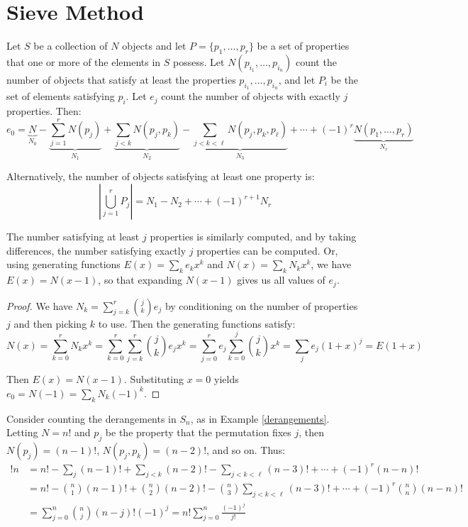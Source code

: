 \documentclass[a4paper]{article}
\begin{document}
\section{Sieve Method}
\begin{theorem}
Let $S$ be a collection of $N$ objects and let $P=\{p_1,\dots,p_r\}$ be a set of properties that one or more of the elements in $S$ possess. Let $N(p_{i_1},\dots,p_{i_n})$ count the number of objects that satisfy at least the properties $p_{i_1},\dots,p_{i_n}$, and let $P_i$ be the set of elements satisfying $p_i$. Let $e_j$ count the number of objects with exactly $j$ properties. Then:
\begin{equation*}
e_0
=\underbrace{N}_{N_0}-\underbrace{\sum_{j=1}^rN(p_j)}_{N_1}+\underbrace{\sum_{j<k}N(p_j,p_k)}_{N_2}-\underbrace{\sum_{j<k<\ell}N(p_j,p_k,p_\ell)}_{N_3}+\cdots+(-1)^r\underbrace{N(p_1,\dots,p_r)}_{N_r}
\end{equation*}

Alternatively, the number of objects satisfying at least one property is:
\begin{equation*}
\left|\bigcup_{j=1}^rP_j\right|
=N_1-N_2+\cdots+(-1)^{r+1}N_r
\end{equation*}

The number satisfying at least $j$ properties is similarly computed, and by taking differences, the number satisfying exactly $j$ properties can be computed. Or, using generating functions $E(x)=\sum_ke_kx^k$ and $N(x)=\sum_kN_kx^k$, we have $E(x)=N(x-1)$, so that expanding $N(x-1)$ gives us all values of $e_j$.
\begin{hl}
\begin{proof}
We have $N_k=\sum_{j=k}^r\binom jke_j$ by conditioning on the number of properties $j$ and then picking $k$ to use. Then the generating functions satisfy:
\begin{equation*}
N(x)
=\sum_{k=0}^rN_kx^k
=\sum_{k=0}^r\sum_{j=k}^r\binom jke_jx^k
=\sum_{j=0}^re_j\sum_{k=0}^j\binom jkx^k
=\sum_je_j(1+x)^j
=E(1+x)
\end{equation*}

Then $E(x)=N(x-1)$. Substituting $x=0$ yields $e_0=N(-1)=\sum_kN_k(-1)^k$.
\end{proof}
\end{hl}
\end{theorem}

\begin{example}
Consider counting the derangements in $S_n$, as in Example \ref{derangements}. Letting $N=n!$ and $p_j$ be the property that the permutation fixes $j$, then $N(p_j)=(n-1)!$, $N(p_j,p_k)=(n-2)!$, and so on. Thus:
\begin{align*}
!n
&=n!-\sum_{j}(n-1)!+\sum_{j<k}(n-2)!-\sum_{j<k<\ell}(n-3)!+\cdots+(-1)^r(n-n)!\\
&=n!-\binom n1(n-1)!+\binom n2(n-2)!-\binom n3\sum_{j<k<\ell}(n-3)!+\cdots+(-1)^r\binom nn(n-n)!\\
&=\sum_{j=0}^n\binom nj(n-j)!(-1)^j
=n!\sum_{j=0}^n\frac{(-1)^j}{j!}
\end{align*}
\end{example}
\end{document}
